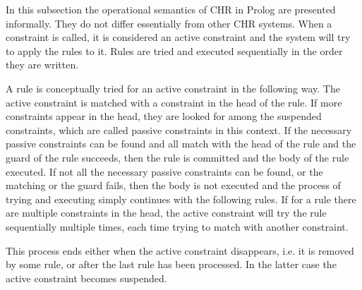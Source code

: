 \documentclass[thesis-solanki.tex]{subfiles}
\begin{document}
In this subsection the operational semantics of CHR
in Prolog are presented informally. They do not differ essentially from other CHR systems.
When a constraint
is called, it is considered an active constraint and the system will try to apply the rules to it. Rules are tried and executed sequentially in the order they are written.

\cite{website:swiprologsyntaxandsemantics}

A rule is conceptually tried for an active constraint in the following way.
The active constraint is matched with a constraint in the head of the rule.
If more constraints appear in the head, they are looked for among the suspended constraints, which are called
passive constraints in this context.
If the necessary passive constraints can be found and all match with the head of the rule and the guard of the rule
succeeds, then the rule is committed and the body of the rule executed.
If not all the necessary passive constraints can be found, or the matching or the guard fails, then the body is not
executed and the process of trying and executing simply continues with the following rules.
If for a rule there are multiple constraints in the head, the active constraint will try the rule sequentially
multiple times, each time trying to match with another constraint.

This process ends either when the active constraint disappears, i.e.\yyy{}{\Large,} it is removed by some rule, or
after the last rule has been processed.
In the latter case the active constraint becomes suspended.
\end{document}

